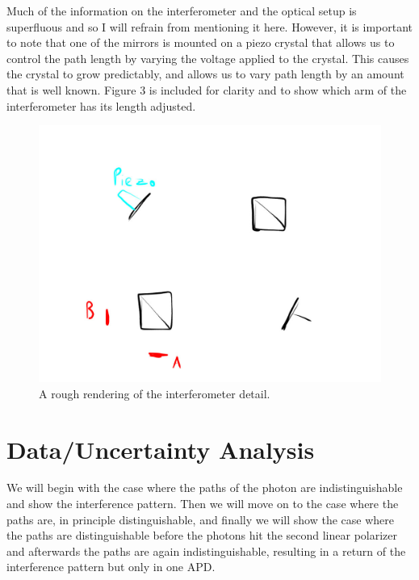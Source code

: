 \documentclass{article}
\begin{document}
Much of the information on the interferometer and the optical setup is superfluous and so I will refrain from mentioning it here.  However, it is important to note that one of the mirrors is mounted on a piezo crystal that allows us to control the path length by varying the voltage applied to the crystal.  This causes the crystal to grow predictably, and allows us to vary path length by an amount that is well known.  Figure 3 is included for clarity and to show which arm of the interferometer has its length adjusted.

\begin{figure}[!htb]
	\centering
	\includegraphics[scale=.3]{interferometer_sketch.jpg}
	\caption{A rough rendering of the interferometer detail.}
\end{figure}



\section{Data/Uncertainty Analysis}

We will begin with the case where the paths of the photon are indistinguishable and show the interference pattern.  Then we will move on to the case where the paths are, in principle distinguishable, and finally we will show the case where the paths are distinguishable before the photons hit the second linear polarizer and afterwards the paths are again indistinguishable, resulting in a return of the interference pattern but only in one APD.
\end{document}
